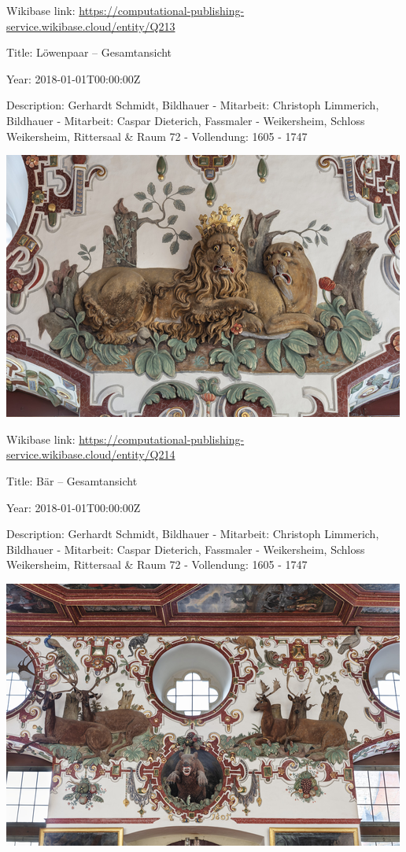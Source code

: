 \documentclass[
  letterpaper,
]{book}
\begin{document}
Wikibase link:
\url{https://computational-publishing-service.wikibase.cloud/entity/Q213}

Title: Löwenpaar -- Gesamtansicht

Year: 2018-01-01T00:00:00Z

Description: Gerhardt Schmidt, Bildhauer - Mitarbeit: Christoph
Limmerich, Bildhauer - Mitarbeit: Caspar Dieterich, Fassmaler -
Weikersheim, Schloss Weikersheim, Rittersaal \& Raum 72 - Vollendung:
1605 - 1747

\includegraphics{paintings_files/figure-pdf/cell-3-output-62.png}

Wikibase link:
\url{https://computational-publishing-service.wikibase.cloud/entity/Q214}

Title: Bär -- Gesamtansicht

Year: 2018-01-01T00:00:00Z

Description: Gerhardt Schmidt, Bildhauer - Mitarbeit: Christoph
Limmerich, Bildhauer - Mitarbeit: Caspar Dieterich, Fassmaler -
Weikersheim, Schloss Weikersheim, Rittersaal \& Raum 72 - Vollendung:
1605 - 1747

\includegraphics{paintings_files/figure-pdf/cell-3-output-64.png}
\end{document}
